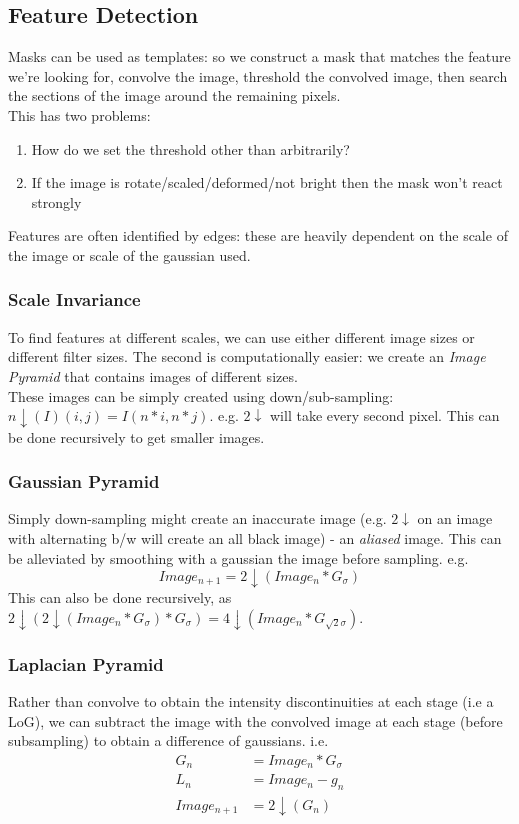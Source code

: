 \subsection{Feature Detection}
Masks can be used as templates: so we construct a mask that matches the feature we're looking for, convolve the image, threshold the convolved image, then search the sections of the image around the remaining pixels. \\
This has two problems: 
\begin{enumerate}
    \item How do we set the threshold other than arbitrarily?
    \item If the image is rotate/scaled/deformed/not bright then the mask won't react strongly
\end{enumerate}
Features are often identified by edges: these are heavily dependent on the scale of the image or scale of the gaussian used. 

\subsubsection{Scale Invariance}
To find features at different scales, we can use either different image sizes or different filter sizes. The second is computationally easier: we create an \emph{Image Pyramid} that contains images of different sizes. \\

These images can be simply created using down/sub-sampling: $n\downarrow(I)(i,j) = I(n*i,n*j)$. e.g. $2\downarrow$ will take every second pixel. This can be done recursively to get smaller images. 

\subsubsection{Gaussian Pyramid}
Simply down-sampling might create an inaccurate image (e.g. $2\downarrow$ on an image with alternating b/w will create an all black image) - an \emph{aliased} image. This can be alleviated by smoothing with a gaussian the image before sampling. e.g.
\begin{equation*}
    Image_{n+1} = 2\downarrow(Image_n \ast G_\sigma )
\end{equation*}
This can also be done recursively, as $2\downarrow(2\downarrow(Image_n \ast G_\sigma ) \ast G_\sigma ) = 4\downarrow(Image_n \ast G_{\sqrt{2}\sigma} )$. 

\subsubsection{Laplacian Pyramid}
Rather than convolve to obtain the intensity discontinuities at each stage (i.e a LoG), we can subtract the image with the convolved image at each stage (before subsampling) to obtain a difference of gaussians. i.e.
\begin{align*}
    G_n &= Image_n * G_\sigma \\
    L_n &= Image_n - g_n \\
    Image_{n+1} &= 2\downarrow(G_n) \\
\end{align*}